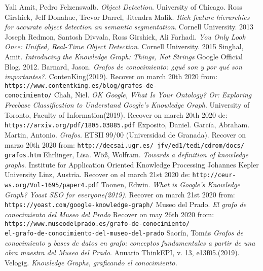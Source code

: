 \begin{thebibliography}{00}
  Yali Amit, Pedro Felzenswalb. \textit{Object Detection}. 
  University of Chicago.
  Ross Girshick, Jeff Donahue, Trevor Darrel, Jitendra Malik.
  \textit{Rich feature hierarchies for accurate object detection an semantic
  segmentation}. Cornell University. 2013
  Joseph Redmon, Santosh Divvala, Ross Girshick, Ali Farhadi.
  \textit{You Only Look Once: Unified, Real-Time Object Detection}.
  Cornell University. 2015
  Singhal, Amit. \textit{Introducing the Knowledge Graph: Things, Not Strings}
  Google Official Blog. 2012.  
  Barnard, Jason. \textit{Grafos de conocimiento: ¿qué son y por qué son
  importantes?}. ContenKing(2019).
  Recover on  march 20th 2020 from:  \\
  \texttt{https://www.contentking.es/blog/grafos-de- \\conocimiento/}
  Chah, Niel. \textit{OK Google, What Is Your Ontology? Or: Exploring Freebase
  Classification to Understand Google’s Knowledge Graph}. University of Toronto,
  Faculty of Information(2019). Recover on  march 20th 2020 de:
  \texttt{https://arxiv.org/pdf/1805.03885.pdf}
  Exposito, Daniel. García, Abraham. Martin, Antonio. \textit{Grafos}.
  ETSII 99/00 (Universidad de Granada). Recover on marzo 20th 2020 from:
  \texttt{http://decsai.ugr.es/~jfv/ed1/tedi/cdrom/docs/ \\grafos.htm}
  Ehrlinger, Lisa. Wöß, Wolfram. \textit{Towards a definition of knowledge 
  graphs}.
  Institute for Application Oriented Knowledge Processing Johannes Kepler
  University Linz, Austria. Recover on  el march 21st  2020 de:
  \texttt{http://ceur-ws.org/Vol-1695/paper4.pdf}
  Toonen, Edwin. \textit{What is Google’s Knowledge Graph? Yoast SEO for
  everyone(2019)}. Recover on march 21st 2020 from:
  \texttt{https://yoast.com/google-knowledge-graph/}
  Museo del Prado. \textit{El grafo de conocimiento del Museo del Prado}
  Recover on may 26th 2020 from:
  \texttt{https://www.museodelprado.es/grafo-de-conocimiento/
  \\el-grafo-de-conocimiento-del-museo-del-prado}
  Saorín, Tomás \textit{Grafos de conocimiento y bases de datos en grafo:
  conceptos fundamentales a partir de una obra maestra del Museo del Prado}.
  Anuario ThinkEPI, v. 13, e13f05.(2019).
  Velogig. \textit{Knowledge Graphs, graficando el conocimiento. 
}
\end{thebibliography}
